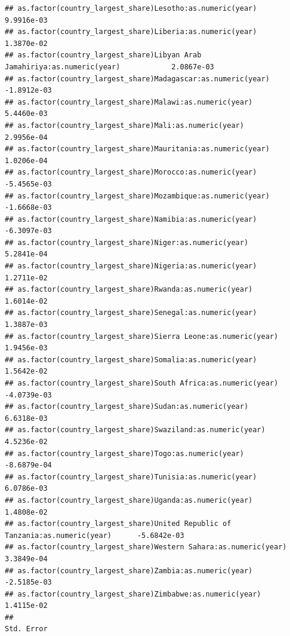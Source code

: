 \documentclass[
  a4paper,
]{article}
\begin{document}
\begin{verbatim}
## as.factor(country_largest_share)Lesotho:as.numeric(year)                           9.9916e-03
## as.factor(country_largest_share)Liberia:as.numeric(year)                           1.3870e-02
## as.factor(country_largest_share)Libyan Arab Jamahiriya:as.numeric(year)            2.0867e-03
## as.factor(country_largest_share)Madagascar:as.numeric(year)                       -1.8912e-03
## as.factor(country_largest_share)Malawi:as.numeric(year)                            5.4460e-03
## as.factor(country_largest_share)Mali:as.numeric(year)                              2.9956e-04
## as.factor(country_largest_share)Mauritania:as.numeric(year)                        1.0206e-04
## as.factor(country_largest_share)Morocco:as.numeric(year)                          -5.4565e-03
## as.factor(country_largest_share)Mozambique:as.numeric(year)                       -1.6668e-03
## as.factor(country_largest_share)Namibia:as.numeric(year)                          -6.3097e-03
## as.factor(country_largest_share)Niger:as.numeric(year)                             5.2841e-04
## as.factor(country_largest_share)Nigeria:as.numeric(year)                           1.2711e-02
## as.factor(country_largest_share)Rwanda:as.numeric(year)                            1.6014e-02
## as.factor(country_largest_share)Senegal:as.numeric(year)                           1.3887e-03
## as.factor(country_largest_share)Sierra Leone:as.numeric(year)                      1.9456e-03
## as.factor(country_largest_share)Somalia:as.numeric(year)                           1.5642e-02
## as.factor(country_largest_share)South Africa:as.numeric(year)                     -4.0739e-03
## as.factor(country_largest_share)Sudan:as.numeric(year)                             6.6318e-03
## as.factor(country_largest_share)Swaziland:as.numeric(year)                         4.5236e-02
## as.factor(country_largest_share)Togo:as.numeric(year)                             -8.6879e-04
## as.factor(country_largest_share)Tunisia:as.numeric(year)                           6.0786e-03
## as.factor(country_largest_share)Uganda:as.numeric(year)                            1.4808e-02
## as.factor(country_largest_share)United Republic of Tanzania:as.numeric(year)      -5.6842e-03
## as.factor(country_largest_share)Western Sahara:as.numeric(year)                    3.3849e-04
## as.factor(country_largest_share)Zambia:as.numeric(year)                           -2.5185e-03
## as.factor(country_largest_share)Zimbabwe:as.numeric(year)                          1.4115e-02
##                                                                                    Std. Error

\end{verbatim}
\end{document}
